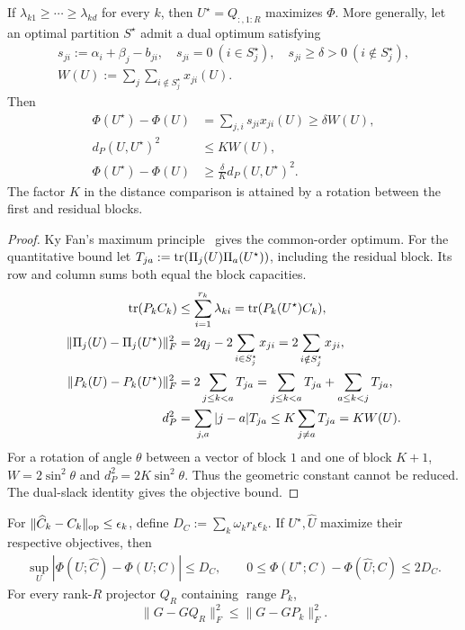 \begin{corollary}\label{cor:tf-common-order}
If $\lambda_{k1}\ge\cdots\ge\lambda_{kd}$ for every $k$, then
$U^\star=Q_{:,1:R}$ maximizes $\Phi$. More generally, let an optimal partition
$S^\star$ admit a dual optimum satisfying
\begin{gather}
 s_{ji}:=\alpha_i+\beta_j-b_{ji},\quad
 s_{ji}=0\ (i\in S_j^\star),\quad s_{ji}\ge\delta>0\ (i\notin S_j^\star),\\
 W(U):=\sum_j\sum_{i\notin S_j^\star}x_{ji}(U).
\end{gather}
Then
\begin{align}
 \Phi(U^\star)-\Phi(U)&=\sum_{j,i}s_{ji}x_{ji}(U)\ge\delta W(U),\\
 d_P(U,U^\star)^2&\le K W(U),\\
 \Phi(U^\star)-\Phi(U)&\ge\frac{\delta}{K}d_P(U,U^\star)^2.
\end{align}
The factor $K$ in the distance comparison is attained by a rotation between
the first and residual blocks.
\end{corollary}
\begin{proof}
Ky Fan's maximum principle~\citep{fan1949weyl} gives the common-order optimum.
For the quantitative bound let $T_{ja}:=\operatorname{tr}(\Pi_j(U)\Pi_a(U^\star))$, including
the residual block. Its row and column sums both equal the block capacities.
\begin{align}
 \operatorname{tr}(P_kC_k)&\le\sum_{i=1}^{r_k}\lambda_{ki}
 =\operatorname{tr}(P_k(U^\star)C_k),\\
 \|\Pi_j(U)-\Pi_j(U^\star)\|_F^2
 &=2q_j-2\sum_{i\in S_j^\star}x_{ji}
 =2\sum_{i\notin S_j^\star}x_{ji},\\
 \|P_k(U)-P_k(U^\star)\|_F^2
 &=2\sum_{j\le k<a}T_{ja}
 =\sum_{j\le k<a}T_{ja}+\sum_{a\le k<j}T_{ja},\\
 d_P^2&=\sum_{j,a}|j-a|T_{ja}\le K\sum_{j\ne a}T_{ja}=KW(U).
\end{align}
For a rotation of angle $\theta$ between a vector of block $1$ and one of
block $K+1$, $W=2\sin^2\theta$ and $d_P^2=2K\sin^2\theta$. Thus the geometric
constant cannot be reduced. The dual-slack identity gives the objective bound.
\end{proof}
\begin{proposition}
\label{prop:tf-value}
For $\|\widehat C_k-C_k\|_{\mathrm{op}}\le\epsilon_k$, define
$D_C:=\sum_k\omega_kr_k\epsilon_k$. If $U^\star,\widehat U$ maximize their
respective objectives, then
\begin{gather}
 \sup_U|\Phi(U;\widehat C)-\Phi(U;C)|\le D_C,\qquad
 0\le\Phi(U^\star;C)-\Phi(\widehat U;C)\le2D_C.
\end{gather}
For every rank-$R$ projector $Q_R$ containing $\operatorname{range}P_k$,
\begin{equation}\label{prop:tf-budget}
 \|G-GQ_R\|_F^2\le\|G-GP_k\|_F^2.
\end{equation}
\end{proposition}
